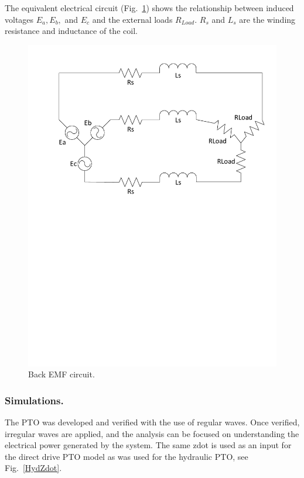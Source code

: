 \documentclass[twocolumn,10pt]{asme2e}
\begin{document}
The equivalent electrical circuit (Fig.~\ref{EMF}) shows the relationship between induced voltages $E_a, E_b,$ and $E_c$ and the external loads $R_{Load}$. $R_s$ and $L_s$ are the winding resistance and inductance of the coil. 

\begin{figure}[t]
    \centering
    \includegraphics[width=1\columnwidth]{Images/BackEMFCkt}
    \caption{Back EMF circuit.}
    \label{EMF}
    \end{figure}

\subsubsection*{Simulations.}
 
The PTO was developed and verified with the use of regular waves. Once verified, irregular waves are applied, and the analysis can be focused on understanding the electrical power generated by the system. The same zdot is used as an input for the direct drive PTO model as was used for the hydraulic PTO, see Fig.~\ref{HydZdot}. 
\end{document}

